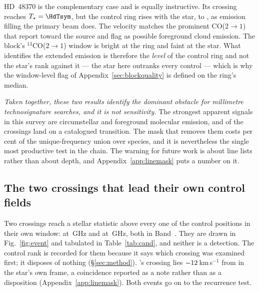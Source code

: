

HD~48370 is the complementary case and is equally instructive. Its crossing
reaches $T_\star=\HdTsym$, but the control ring rises with the star, to
\HdRingMax, as emission filling the primary beam does. The velocity matches
the prominent CO($2{\to}1$) that \citet{Cataldi2023} report toward the
source and flag as possible foreground cloud emission. The block's
$^{13}$CO($2{\to}1$) window is bright at the ring and faint at the star.
What identifies the extended emission is therefore the \emph{level} of the
control ring and not the star's rank against it --- the star here outranks
every control --- which is why the window-level flag of
Appendix~\ref{sec:blockquality} is defined on the ring's median.

\emph{Taken together, these two results identify the dominant obstacle for
millimetre technosignature searches, and it is not sensitivity.} The
strongest apparent signals in this survey are circumstellar and foreground
molecular emission, and \NAttributed{} of the \NCross{} crossings land on a
catalogued transition. The mask that removes them costs \FrMaskPct{} per
cent of the unique-frequency union over \FrNSpec{} species, and it is
nevertheless the single most productive test in the chain. The warning for
future work is about line lists rather than about depth, and
Appendix~\ref{app:linemask} puts a number on it.

\subsection{The two crossings that lead their own control fields}
\label{sec:vistest}

Two crossings reach a stellar statistic above every one of the \NCtrl{}
control positions in their own window: \EvAStar{} at \EvAFreq\,GHz and
\EvBStar{} at \EvBFreq\,GHz, both in Band~\EvABand. They are drawn in
Fig.~\ref{fig:event} and tabulated in Table~\ref{tab:cand}, and neither is a
detection. The control rank is recorded for them because it says which
crossing was examined first; it disposes of nothing (\S\ref{sec:method}).
\EvBStar's crossing lies $-12$\,km\,s$^{-1}$ from \EvBLine{} in the star's
own frame, a coincidence reported as a note rather than as a disposition
(Appendix~\ref{app:linemask}). Both events go on to the recurrence test.

